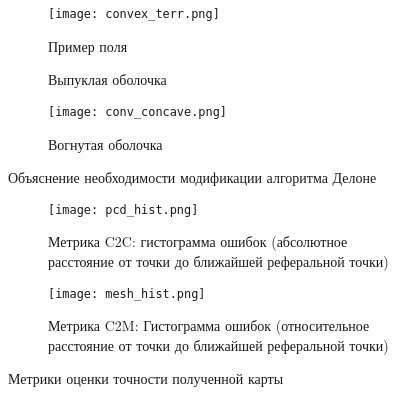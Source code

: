 \begin{figure}[H]
    \begin{subfigure}[t]{0.3\textwidth}
        \centering\texttt{[image: convex\_terr.png]}
        \caption{Пример поля}
        \label{fig:convex_terr.png}
    \end{subfigure}
    \hfill
    \begin{subfigure}[t]{0.33\textwidth}
        \centering
        \caption{Выпуклая оболочка}
        \label{fig:conv_convex.png}
    \end{subfigure}
    \hfill
    \begin{subfigure}[t]{0.30\textwidth}
        \centering\texttt{[image: conv\_concave.png]}
        \caption{Вогнутая оболочка}
        \label{fig:conv_concave.png}
    \end{subfigure}
    \caption{Объяснение необходимости модификации алгоритма Делоне}
    \label{fig:exp_concave_hull}
\end{figure}

\begin{figure}[H]
    \begin{subfigure}[t]{0.49\textwidth}
        \centering\texttt{[image: pcd\_hist.png]}
        \caption{Метрика C2C: гистограмма ошибок (абсолютное расстояние от точки до ближайшей реферальной точки)}
        \label{fig:metric_c2c}
    \end{subfigure}
    \begin{subfigure}[t]{0.49\textwidth}
        \centering\texttt{[image: mesh\_hist.png]}
        \caption{Метрика C2M: Гистограмма ошибок (относительное расстояние от точки до ближайшей реферальной точки)}
        \label{fig:metric_c2m}
    \end{subfigure}
    \caption{Метрики оценки точности полученной карты}
    \label{fig:metrics}
\end{figure}


